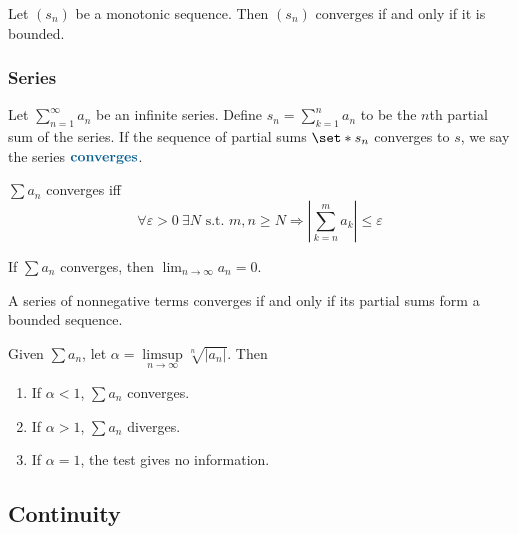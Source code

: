 \documentclass[11pt]{article}
\numberwithin{equation}{section}
\newcommand{\navy}[1]{\textcolor{MidnightBlue}{\bf #1}}
\theoremstyle{definition}
\theoremstyle{definition}
\newcommand\abs[1]{\left| #1 \right|}
\def\Set{\set*}%
\def\imp{\Rightarrow}
\newcommand{\1}{\mathbbm 1}
\newcommand{\e}{\varepsilon}
\begin{document}
\begin{theorem}
	Let $(s_n)$ be a monotonic sequence. Then $(s_n)$ converges if and only if it is bounded. 
\end{theorem}

\subsubsection{Series}

\begin{definition}
	Let $\sum_{n=1}^\infty a_n$ be an infinite series. Define $s_n = \sum_{k=1}^n a_n$ to be the $n$th partial sum of the series. If the sequence of partial sums $\Set{s_n}$ converges to $s$, we say the series $\navy{converges}$.  
\end{definition}

\begin{theorem}
	$\sum a_n$ converges iff
	\begin{equation}
		\forall \e > 0 \ \exists N \text{ s.t. } m,n \geq N \imp \abs{\sum_{k=n}^m a_k} \leq \e
	\end{equation}
\end{theorem}

\begin{theorem}
	If $\sum a_n$ converges, then $\lim_{n \to \infty} a_n = 0$. 
\end{theorem}

\begin{theorem}[]
	A series of nonnegative terms converges if and only if its partial sums form a bounded sequence. 
\end{theorem}

\begin{theorem}
	Given $\sum a_n$, let $\alpha = \limsup\limits_{n \to \infty} \sqrt[n]{\abs{a_n}}$. Then
	\begin{enumerate}
		\item If $\alpha < 1$, $\sum a_n$ converges.
		\item If $\alpha > 1$, $\sum a_n$ diverges.
		\item If $\alpha = 1$, the test gives no information. 
	\end{enumerate}
\end{theorem}




\subsection{Continuity}
\end{document}
